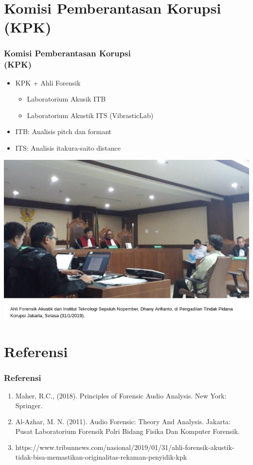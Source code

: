 \documentclass[pdflatex,compress]{beamer}
\begin{document}
\section{Komisi Pemberantasan Korupsi (KPK)}

\begin{frame}
	\frametitle{Komisi Pemberantasan Korupsi\\(KPK)}
	\begin{itemize}
		\item KPK + Ahli Forensik
		\begin{itemize}
			\item Laboratorium Akusik ITB
			\item Laboratorium Akustik ITS (VibrasticLab)
		\end{itemize}
		\item ITB: Analisis pitch dan formant
		\item ITS: Analisis itakura-saito distance
	\end{itemize}
	\begin{center}
		\includegraphics[width=0.5\linewidth]{img/img04}
	\end{center}
\end{frame}

\section{Referensi}

\begin{frame}
	\frametitle{Referensi}
	\begin{enumerate}
		\item Maher, R.C., (2018). Principles of Forensic Audio Analysis. New York: Springer.
		\item Al-Azhar, M. N. (2011). Audio Forensic: Theory And Analysis. Jakarta: Pusat Laboratorium Forensik Polri
		Bidang Fisika Dan Komputer Forensik.
		\item https://www.tribunnews.com/nasional/2019/01/31/ahli-forensik-akustik-tidak-bisa-memastikan-originalitas-rekaman-penyidik-kpk
	\end{enumerate}
\end{frame}
\end{document}
